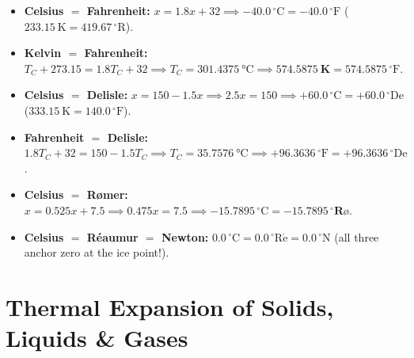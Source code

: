 \begin{shortcut}
\begin{itemize}
  \item \textbf{Celsius $=$ Fahrenheit:} $x = 1.8x + 32 \implies \mathbf{-40.0\,^\circ\mathrm{C} = -40.0\,^\circ\mathrm{F}}$ ($\SI{233.15}{\kelvin} = 419.67\,^\circ\mathrm{R}$).
  \item \textbf{Kelvin $=$ Fahrenheit:} $T_C + 273.15 = 1.8T_C + 32 \implies T_C = \SI{301.4375}{\celsius} \implies \mathbf{\SI{574.5875}{\kelvin} = 574.5875\,^\circ\mathrm{F}}$.
  \item \textbf{Celsius $=$ Delisle:} $x = 150 - 1.5x \implies 2.5x = 150 \implies \mathbf{+60.0\,^\circ\mathrm{C} = +60.0\,^\circ\mathrm{De}}$ ($\SI{333.15}{\kelvin} = 140.0\,^\circ\mathrm{F}$).
  \item \textbf{Fahrenheit $=$ Delisle:} $1.8T_C + 32 = 150 - 1.5T_C \implies T_C = \SI{35.7576}{\celsius} \implies \mathbf{+96.3636\,^\circ\mathrm{F} = +96.3636\,^\circ\mathrm{De}}$.
  \item \textbf{Celsius $=$ R\o mer:} $x = 0.525x + 7.5 \implies 0.475x = 7.5 \implies \mathbf{-15.7895\,^\circ\mathrm{C} = -15.7895\,^\circ\text{R\o}}$.
  \item \textbf{Celsius $=$ R\'eaumur $=$ Newton:} $\mathbf{0.0\,^\circ\mathrm{C} = 0.0\,^\circ\mathrm{R\acute{e}} = 0.0\,^\circ\mathrm{N}}$ (all three anchor zero at the ice point!).
\end{itemize}
\end{shortcut}

\section{Thermal Expansion of Solids, Liquids \& Gases}
\label{sec:03.3}

